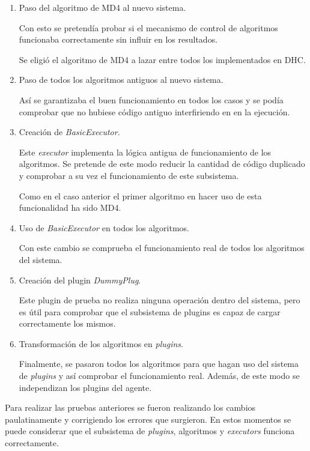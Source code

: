 \begin{enumerate}
	\item Paso del algoritmo de MD4 al nuevo sistema.
	
	Con esto se pretendía probar si el mecanismo de control de algoritmos funcionaba correctamente sin influir en los resultados.
	
	Se eligió el algoritmo de MD4 a lazar entre todos los implementados en DHC.
	
	\item Paso de todos los algoritmos antiguos al nuevo sistema.
	
	Así se garantizaba el buen funcionamiento en todos los casos y se podía comprobar que no hubiese código antiguo interfiriendo en en la ejecución.
	
	\item Creación de \emph{BasicExecutor}.
	
	Este \emph{executor} implementa la lógica antigua de funcionamiento de los algoritmos. Se pretende de este modo reducir la cantidad de código duplicado y comprobar a su vez el funcionamiento de este subsistema.
	
	Como en el caso anterior el primer algoritmo en hacer uso de esta funcionalidad ha sido MD4.
	
	\item Uso de \emph{BasicExecutor} en todos los algoritmos.
	
	Con este cambio se comprueba el funcionamiento real de todos los algoritmos del sistema.
	
	\item Creación del plugin \emph{DummyPlug}.
	
	Este plugin de prueba no realiza ninguna operación dentro del sistema, pero es útil para comprobar que el subsistema de plugins es capaz de cargar correctamente los mismos.
	
	\item Transformación de los algoritmos en \emph{plugins}.
	
	Finalmente, se pasaron todos los algoritmos para que hagan uso del sistema de \emph{plugins} y así comprobar el funcionamiento real. Además, de este modo se independizan los plugins del agente.
\end{enumerate}

Para realizar las pruebas anteriores se fueron realizando los cambios paulatinamente y corrigiendo los errores que surgieron. En estos momentos se puede considerar que el subsistema de \emph{plugins}, algoritmos y \emph{executors} funciona correctamente.

